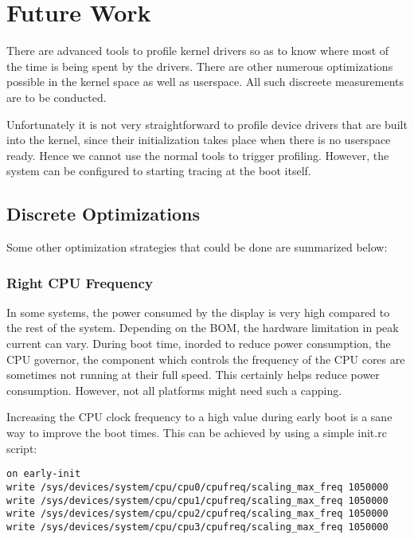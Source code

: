 

\section{Future Work}
\label{fut_work}


\hspace{8mm} 

\noindent There are advanced tools to profile kernel drivers so as to know
where most of the time is being spent by the drivers. There are other numerous
optimizations possible in the kernel space as well as userspace.
All such discreete measurements are to be conducted.

Unfortunately it is not very straightforward to profile device drivers that are built into the kernel,
since their initialization takes place when there is no userspace ready. Hence we cannot use the normal
tools to trigger profiling. However, the system can be configured to starting tracing at the boot itself.

\subsection{Discrete Optimizations}

Some other optimization strategies that could be done are summarized below:

\subsubsection{Right CPU Frequency}

In some systems, the power consumed by the display is very high compared to
the rest of the system. Depending on the BOM, the hardware limitation in peak
current can vary. During boot time, inorded to reduce power consumption,
the CPU governor, the component which controls the frequency of the CPU
cores are sometimes not running at their full speed. This certainly helps
reduce power consumption. However, not all platforms might need such a capping.

Increasing the CPU clock frequency to a high value during early boot is a sane
way to improve the boot times. This can be achieved by using a simple
init.rc script:
\begin{verbatim}
on early-init
write /sys/devices/system/cpu/cpu0/cpufreq/scaling_max_freq 1050000
write /sys/devices/system/cpu/cpu1/cpufreq/scaling_max_freq 1050000
write /sys/devices/system/cpu/cpu2/cpufreq/scaling_max_freq 1050000
write /sys/devices/system/cpu/cpu3/cpufreq/scaling_max_freq 1050000
\end{verbatim}

